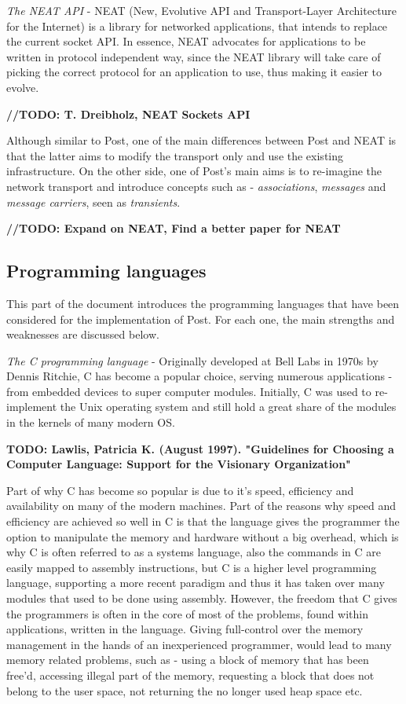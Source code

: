 \documentclass{mprop}
\begin{document}
\qquad \textit{The NEAT API} - NEAT (New, Evolutive API and Transport-Layer Architecture for the Internet) is a library for networked applications, that intends to replace the current socket API. In essence, NEAT advocates for applications to be written in protocol independent way, since the NEAT library will take care of picking the correct protocol for an application to use, thus making it easier to evolve.

\textbf{//TODO: T. Dreibholz, NEAT Sockets API}

\qquad Although similar to Post, one of the main differences between Post and NEAT is that the latter aims to modify the transport only and use the existing infrastructure. On the other side, one of Post's main aims is to re-imagine the network transport and introduce concepts such as - \textit{associations}, \textit{messages} and \textit{message carriers}, seen as \textit{transients}.

\textbf{//TODO: Expand on NEAT, Find a better paper for NEAT}

\subsection{Programming languages}

\qquad This part of the document introduces the programming languages that have been considered for the implementation of Post. For each one, the main strengths and weaknesses are discussed below.

\qquad  \textit{The C programming language} - Originally developed at Bell Labs in 1970s by Dennis Ritchie, C has become a popular choice, serving numerous applications - from embedded devices to super computer modules. Initially, C was used to re-implement the Unix operating system and still hold a great share of the modules in the kernels of many modern OS.

\textbf{TODO: Lawlis, Patricia K. (August 1997). "Guidelines for Choosing a Computer Language: Support for the Visionary Organization"}

\qquad Part of why C has become so popular is due to it’s speed, efficiency and availability on many of the modern machines. Part of the reasons why speed and efficiency are achieved so well in C is that the language gives the programmer the option to manipulate the memory and hardware without a big overhead, which is why C is often referred to as a systems language, also the commands in C are easily mapped to assembly instructions, but C is a higher level programming language, supporting a more recent paradigm and thus it has taken over many modules that used to be done using assembly. However, the freedom that C gives the programmers is often in the core of most of the problems, found within applications, written in the language. Giving full-control over the memory management in the hands of an inexperienced programmer, would lead to many memory related problems, such as - using a block of memory that has been free’d, accessing illegal part of the memory, requesting a block that does not belong to the user space, not returning the no longer used heap space etc.
\end{document}

